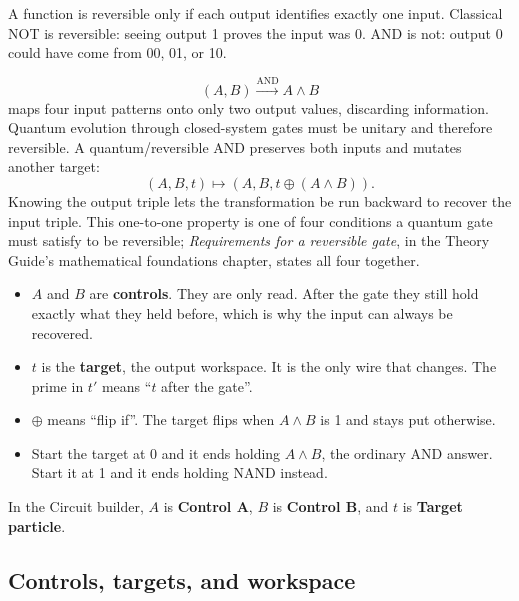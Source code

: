 A function is reversible only if each output identifies exactly one input.
Classical NOT is reversible: seeing output 1 proves the input was 0. AND is not:
output 0 could have come from 00, 01, or 10.

\[
(A,B)\xrightarrow{\mathrm{AND}}A\land B
\]
maps four input patterns onto only two output values, discarding information.
Quantum evolution through closed-system gates must be unitary and therefore
reversible. A quantum/reversible AND preserves both inputs and mutates another
target:
\[
(A,B,t)\longmapsto(A,B,t\oplus(A\land B)).
\]
Knowing the output triple lets the transformation be run backward to recover
the input triple. This one-to-one property is one of four conditions a
quantum gate must satisfy to be reversible; \emph{Requirements for a
reversible gate}, in the Theory Guide's mathematical foundations chapter,
states all four together.

\begin{beginnerbox}[How to read $t' = t\oplus(A\land B)$]
\begin{itemize}
  \item $A$ and $B$ are \textbf{controls}. They are only read. After the gate
  they still hold exactly what they held before, which is why the input can
  always be recovered.
  \item $t$ is the \textbf{target}, the output workspace. It is the only wire
  that changes. The prime in $t'$ means ``$t$ after the gate''.
  \item $\oplus$ means ``flip if''. The target flips when $A\land B$ is 1 and
  stays put otherwise.
  \item Start the target at 0 and it ends holding $A\land B$, the ordinary AND
  answer. Start it at 1 and it ends holding NAND instead.
\end{itemize}
In the Circuit builder, $A$ is \textbf{Control A}, $B$ is
\textbf{Control B}, and $t$ is \textbf{Target particle}.
\end{beginnerbox}

\subsection{Controls, targets, and workspace}

